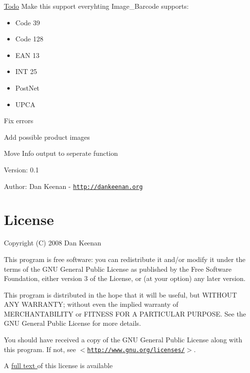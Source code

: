 \begin{Desc}
\item[\hyperlink{todo__todo000001}{Todo}]Make this support everyhting Image\_\-Barcode supports:\begin{itemize}
\item Code 39\item Code 128\item EAN 13\item INT 25\item PostNet\item UPCA \end{itemize}


Fix errors 

Add possible product images 

Move Info output to seperate function\end{Desc}
\begin{Desc}
\item[Version:]0.1 \end{Desc}
\begin{Desc}
\item[Author:]Dan Keenan - \href{http://dankeenan.org}{\tt http://dankeenan.org} \end{Desc}
\hypertarget{main_license}{}\section{License}\label{main_license}
Copyright (C) 2008 Dan Keenan

This program is free software: you can redistribute it and/or modify it under the terms of the GNU General Public License as published by the Free Software Foundation, either version 3 of the License, or (at your option) any later version.

This program is distributed in the hope that it will be useful, but WITHOUT ANY WARRANTY; without even the implied warranty of MERCHANTABILITY or FITNESS FOR A PARTICULAR PURPOSE. See the GNU General Public License for more details.

You should have received a copy of the GNU General Public License along with this program. If not, see $<$\href{http://www.gnu.org/licenses/}{\tt http://www.gnu.org/licenses/}$>$.



A \hyperlink{license}{full text } of this license is available 